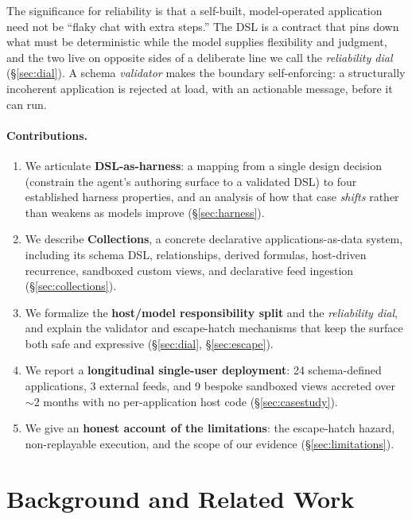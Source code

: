 \documentclass[11pt]{article}
\begin{document}
The significance for reliability is that a self-built, model-operated application
need not be ``flaky chat with extra steps.'' The DSL is a contract that pins down
what must be deterministic while the model supplies flexibility and judgment, and
the two live on opposite sides of a deliberate line we call the \emph{reliability
dial} (\S\ref{sec:dial}). A schema \emph{validator} makes the boundary
self-enforcing: a structurally incoherent application is rejected at load, with an
actionable message, before it can run.

\paragraph{Contributions.}
\begin{enumerate}
  \item We articulate \textbf{DSL-as-harness}: a mapping from a single design
  decision (constrain the agent's authoring surface to a validated DSL) to four
  established harness properties, and an analysis of how that case \emph{shifts}
  rather than weakens as models improve (\S\ref{sec:harness}).
  \item We describe \textbf{Collections}, a concrete declarative
  applications-as-data system, including its schema DSL, relationships, derived
  formulas, host-driven recurrence, sandboxed custom views, and declarative feed
  ingestion (\S\ref{sec:collections}).
  \item We formalize the \textbf{host/model responsibility split} and the
  \emph{reliability dial}, and explain the validator and escape-hatch mechanisms
  that keep the surface both safe and expressive (\S\ref{sec:dial},
  \S\ref{sec:escape}).
  \item We report a \textbf{longitudinal single-user deployment}: 24 schema-defined
  applications, 3 external feeds, and 9 bespoke sandboxed views accreted over
  $\sim$2 months with no per-application host code (\S\ref{sec:casestudy}).
  \item We give an \textbf{honest account of the limitations}: the escape-hatch
  hazard, non-replayable execution, and the scope of our evidence
  (\S\ref{sec:limitations}).
\end{enumerate}

\section{Background and Related Work}
\label{sec:related}
\end{document}
